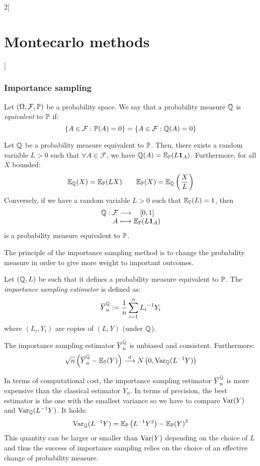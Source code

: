 \documentclass[../../../main_math.tex]{subfiles}
\begin{document}
\begin{multicols}{2}[\section{Montecarlo methods}]
  \subsubsection{Importance sampling}
  \begin{definition}
    Let $(\Omega, \mathcal{F}, \mathbb{P})$ be a probability space. We say that a probability measure $\mathbb{Q}$ is \emph{equivalent} to $\mathbb{P}$ if:
    $$
      \{A\in \mathcal{F} : \mathbb{P}(A)=0\}=\{A\in \mathcal{F} : \mathbb{Q}(A)=0\}
    $$
  \end{definition}
  \begin{lemma}
    Let $\mathbb{Q}$ be a probability measure equivalent to $\mathbb{P}$. Then, there exists a random variable $L>0$ such that $\forall A\in \mathcal{F}$, we have $\mathbb{Q}(A)=\mathbb{E}_{\mathbb{P}}(L\boldsymbol{\mathrm{1}}_{A})$. Furthermore, for all $X$ bounded:
    $$
      \mathbb{E}_{\mathbb{Q}}(X)=\mathbb{E}_{\mathbb{P}}(L X)\qquad \mathbb{E}_{\mathbb{P}}(X)=\mathbb{E}_{\mathbb{Q}}\left(\frac{X}{L}\right)
    $$
    Conversely, if we have a random variable $L>0$ such that $\mathbb{E}_{\mathbb{P}}(L)=1$, then
    $$
      \function{\QQ}{\mathcal{F}}{[0,1]}{A}{\Exp_\Prob(L\indi{A})}
    $$
    is a probability measure equivalent to $\mathbb{P}$.
  \end{lemma}
  \begin{remark}
    The principle of the importance sampling method is to change the probability measure in order to give more weight to important outcomes.
  \end{remark}
  \begin{definition}
    Let $(\mathbb{Q},L)$ be such that it defines a probability measure equivalent to $\mathbb{P}$. The \emph{importance sampling estimator} is defined as:
    $$
      \overline{Y}_n^{\mathbb{Q}}:=\frac{1}{n}\sum_{i=1}^n {L_i}^{-1}Y_i
    $$
    where $(L_i,Y_i)$ are \iid copies of $(L,Y)$ (under $\mathbb{Q}$).
  \end{definition}
  \begin{lemma}
    The importance sampling estimator $\overline{Y}_n^{\mathbb{Q}}$ is unbiased and consistent. Furthermore:
    $$
      \sqrt{n}\left(\overline{Y}_n^{\mathbb{Q}}-\mathbb{E}_{\mathbb{P}}(Y)\right)\overset{\text{d}}{\longrightarrow}N\left(0,\mathrm{Var}_{\mathbb{Q}}(L^{-1}Y)\right)
    $$
  \end{lemma}
  \begin{remark}
    In terms of computational cost, the importance sampling estimator $\overline{Y}_n^{\mathbb{Q}}$ is more expensive than the classical estimator $\overline{Y}_n$. In terms of precision, the best estimator is the one with the smallest variance so we have to compare $\mathrm{Var}(Y)$ and $\mathrm{Var}_{\mathbb{Q}}(L^{-1}Y)$. It holds:
    $$
      \mathrm{Var}_{\mathbb{Q}}(L^{-1}Y)=\mathbb{E}_{\mathbb{P}}\left(L^{-1}Y^2\right)-{\mathbb{E}_{\mathbb{P}}(Y)}^2
    $$
    This quantity can be larger or smaller than $\mathrm{Var}(Y )$ depending on the choice of $L$ and thus the success of importance sampling relies on the choice of an effective change of probability measure.
  \end{remark}

\end{multicols}
\end{document}
